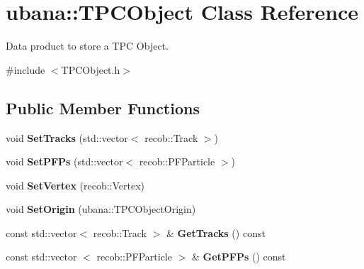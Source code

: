 \hypertarget{classubana_1_1TPCObject}{\section{ubana\-:\-:\-T\-P\-C\-Object \-Class \-Reference}
\label{classubana_1_1TPCObject}
}


\-Data product to store a \-T\-P\-C \-Object.  




{\ttfamily \#include $<$\-T\-P\-C\-Object.\-h$>$}

\subsection*{\-Public \-Member \-Functions}
\begin{DoxyCompactItemize}
\item 
\hypertarget{classubana_1_1TPCObject_a0766c8648ada3d539b474e40a107d8c1}{void {\bfseries \-Set\-Tracks} (std\-::vector$<$ recob\-::\-Track $>$)}\label{classubana_1_1TPCObject_a0766c8648ada3d539b474e40a107d8c1}

\item 
\hypertarget{classubana_1_1TPCObject_ab35b580187ad16cbd53325e8c776f655}{void {\bfseries \-Set\-P\-F\-Ps} (std\-::vector$<$ recob\-::\-P\-F\-Particle $>$)}\label{classubana_1_1TPCObject_ab35b580187ad16cbd53325e8c776f655}

\item 
\hypertarget{classubana_1_1TPCObject_a1fed8d9f87fc301a8cbee484a8434a05}{void {\bfseries \-Set\-Vertex} (recob\-::\-Vertex)}\label{classubana_1_1TPCObject_a1fed8d9f87fc301a8cbee484a8434a05}

\item 
\hypertarget{classubana_1_1TPCObject_ad4946cb455555486b701dd1301a26f56}{void {\bfseries \-Set\-Origin} (ubana\-::\-T\-P\-C\-Object\-Origin)}\label{classubana_1_1TPCObject_ad4946cb455555486b701dd1301a26f56}

\item 
\hypertarget{classubana_1_1TPCObject_a44cc29b00093d89d9f7fe834570d77be}{const std\-::vector$<$ recob\-::\-Track $>$ \& {\bfseries \-Get\-Tracks} () const }\label{classubana_1_1TPCObject_a44cc29b00093d89d9f7fe834570d77be}

\item 
\hypertarget{classubana_1_1TPCObject_a98af6b4a96031938afd18c372cd9d6d6}{const std\-::vector\*
$<$ recob\-::\-P\-F\-Particle $>$ \& {\bfseries \-Get\-P\-F\-Ps} () const }\label{classubana_1_1TPCObject_a98af6b4a96031938afd18c372cd9d6d6}


\end{DoxyCompactItemize}
